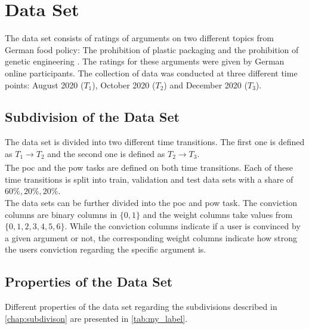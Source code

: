 \section{Data Set}
\label{sec:dataset}
The data set consists of ratings of arguments on two different topics from German food policy: The prohibition of plastic packaging and the prohibition of genetic engineering \cite{brenneis2021will}. The ratings for these arguments were given by German online participants. The collection of data was conducted at three different time points: August 2020 ($T_1$), October 2020 ($T_2$) and December 2020 ($T_3$). 

\subsection{Subdivision of the Data Set}
\label{chap:subdivison}
The data set is divided into two different time transitions. The first one is defined as $T_1 \xrightarrow[]{} T_2$ and the second one is defined as $T_2 \xrightarrow[]{} T_3$.\\
The \acrshort{poc} and the \acrshort{pow} tasks are defined on both time transitions.
Each of these time transitions is split into train, validation and test data sets with a share of $60\%, 20\%, 20\%$.\\
The data sets can be further divided into the \acrshort{poc} and \acrshort{pow} task. The conviction columns are binary columns in $\{0,1\}$ and the weight columns take values from $\{0,1,2,3,4,5,6\}$. While the conviction columns indicate if a user is convinced by a given argument or not, the corresponding weight columns indicate how strong the users conviction regarding the specific argument is.

\subsection{Properties of the Data Set}
Different properties of the data set regarding the subdivisions described in \autoref{chap:subdivison} are presented in \autoref{tab:my_label}.

